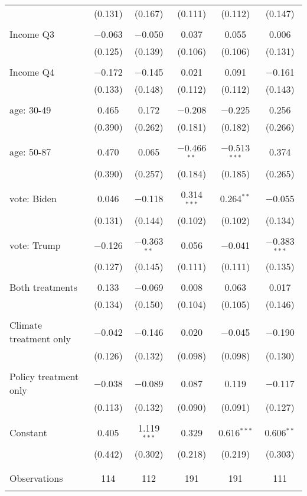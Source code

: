 \begin{tabular}{@{\extracolsep{5pt}}lccccc}
  & (0.131) & (0.167) & (0.111) & (0.112) & (0.147) \\ 
  & & & & & \\ 
 Income Q3 & $-$0.063 & $-$0.050 & 0.037 & 0.055 & 0.006 \\ 
  & (0.125) & (0.139) & (0.106) & (0.106) & (0.131) \\ 
  & & & & & \\ 
 Income Q4 & $-$0.172 & $-$0.145 & 0.021 & 0.091 & $-$0.161 \\ 
  & (0.133) & (0.148) & (0.112) & (0.112) & (0.143) \\ 
  & & & & & \\ 
 age: 30-49 & 0.465 & 0.172 & $-$0.208 & $-$0.225 & 0.256 \\ 
  & (0.390) & (0.262) & (0.181) & (0.182) & (0.266) \\ 
  & & & & & \\ 
 age: 50-87 & 0.470 & 0.065 & $-$0.466$^{**}$ & $-$0.513$^{***}$ & 0.374 \\ 
  & (0.390) & (0.257) & (0.184) & (0.185) & (0.265) \\ 
  & & & & & \\ 
 vote: Biden & 0.046 & $-$0.118 & 0.314$^{***}$ & 0.264$^{**}$ & $-$0.055 \\ 
  & (0.131) & (0.144) & (0.102) & (0.102) & (0.134) \\ 
  & & & & & \\ 
 vote: Trump & $-$0.126 & $-$0.363$^{**}$ & 0.056 & $-$0.041 & $-$0.383$^{***}$ \\ 
  & (0.127) & (0.145) & (0.111) & (0.111) & (0.135) \\ 
  & & & & & \\ 
 Both treatments & 0.133 & $-$0.069 & 0.008 & 0.063 & 0.017 \\ 
  & (0.134) & (0.150) & (0.104) & (0.105) & (0.146) \\ 
  & & & & & \\ 
 Climate treatment only & $-$0.042 & $-$0.146 & 0.020 & $-$0.045 & $-$0.190 \\ 
  & (0.126) & (0.132) & (0.098) & (0.098) & (0.130) \\ 
  & & & & & \\ 
 Policy treatment only & $-$0.038 & $-$0.089 & 0.087 & 0.119 & $-$0.117 \\ 
  & (0.113) & (0.132) & (0.090) & (0.091) & (0.127) \\ 
  & & & & & \\ 
 Constant & 0.405 & 1.119$^{***}$ & 0.329 & 0.616$^{***}$ & 0.606$^{**}$ \\ 
  & (0.442) & (0.302) & (0.218) & (0.219) & (0.303) \\ 
  & & & & & \\ 
\hline \\[-1.8ex] 

Observations & 114 & 112 & 191 & 191 & 111 \\ 
\hline 
\hline \\[-1.8ex] 
\end{tabular} 